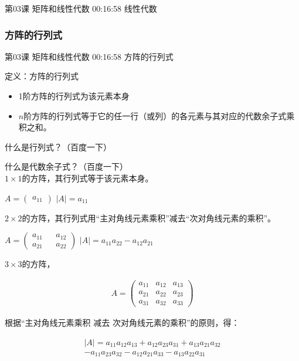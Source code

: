 \documentclass[UTF8]{ctexbook}
\begin{document}
第03课 矩阵和线性代数 00:16:58 线性代数

\subsubsection{方阵的行列式}

第03课 矩阵和线性代数 00:16:58 方阵的行列式

定义：方阵的行列式

\begin{itemize}
\item 1阶方阵的行列式为该元素本身
\item $n$阶方阵的行列式等于它的任一行（或列）的各元素与其对应的代数余子式乘积之和。
\end{itemize}

什么是行列式？（百度一下）

什么是代数余子式？（百度一下）\\

$1 \times 1$的方阵，其行列式等于该元素本身。

$A=\begin{pmatrix} a_{11} \end{pmatrix}$ \quad $|A|=a_{11}$

$2 \times 2$的方阵，其行列式用“主对角线元素乘积”减去“次对角线元素的乘积”。

$A=\begin{pmatrix} a_{11} && a_{12} \\ a_{21} && a_{22} \end{pmatrix}$ \quad
$|A|=a_{11}a_{22}-a_{12}a_{21}$

$3 \times 3$的方阵，

\begin{equation}
\begin{aligned}
A=
\begin{pmatrix}
a_{11} & a_{12} & a_{13} \\
a_{21} & a_{22} & a_{23} \\
a_{31} & a_{32} & a_{33}
\end{pmatrix}
\end{aligned}
\end{equation}

根据“主对角线元素乘积 减去 次对角线元素的乘积”的原则，得：

\begin{equation}
\begin{aligned}
|A|=a_{11}a_{12}a_{13}+a_{12}a_{23}a_{31}+a_{13}a_{21}a_{32} \\
-a_{11}a_{23}a_{32}-a_{12}a_{21}a_{33}-a_{13}a_{22}a_{31}
\end{aligned}
\end{equation}
\end{document}
